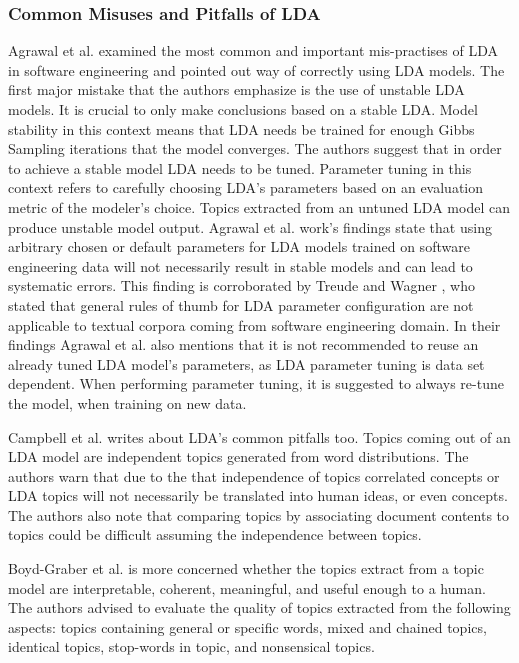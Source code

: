         \subsubsection{Common Misuses and Pitfalls of LDA}
            Agrawal et al. \cite{agrawal2018wrong} examined the most common and important mis-practises of LDA in software engineering and pointed out way of correctly using LDA models. The first major mistake that the authors emphasize is the use of unstable LDA models. It is crucial to only make conclusions based on a stable LDA. Model stability in this context means that LDA needs be trained for enough Gibbs Sampling iterations that the model converges. The authors suggest that in order to achieve a stable model LDA needs to be tuned. Parameter tuning in this context refers to carefully choosing LDA's parameters based on an evaluation metric of the modeler's choice. Topics extracted from an untuned LDA model can produce unstable model output. Agrawal et al. \cite{agrawal2018wrong} work's findings state that using arbitrary chosen or default parameters for LDA models trained on software engineering data will not necessarily result in stable models and can lead to systematic errors. This finding is corroborated by Treude and Wagner \cite{treude2019predicting}, who stated that general rules of thumb for LDA parameter configuration are not applicable to textual corpora coming from software engineering domain. In their findings Agrawal et al. \cite{agrawal2018wrong} also mentions that it is not recommended to reuse an already tuned LDA model's parameters, as LDA parameter tuning is data set dependent. When performing parameter tuning, it is suggested to always re-tune the model, when training on new data.
            
            Campbell et al. \cite{campbell2015latent} writes about LDA's common pitfalls too. Topics coming out of an LDA model are independent topics generated from word distributions. The authors warn that due to the that independence of topics correlated concepts or LDA topics will not  necessarily be translated into human ideas, or even concepts. The authors also note that comparing topics by associating document contents to topics could be difficult assuming the independence between topics.
            
            Boyd-Graber et al. \cite{boyd2014care} is more concerned whether the topics extract from a topic model are interpretable, coherent, meaningful, and useful enough to a human. The authors advised to evaluate the quality of topics extracted from the following aspects: topics containing general or specific words, mixed and chained topics, identical topics, stop-words in topic, and nonsensical topics.
            
